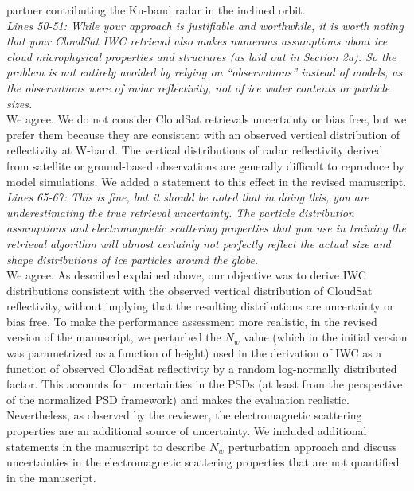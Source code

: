 \documentclass[12pt]{article}
\begin{document}
partner contributing the Ku-band radar in the inclined orbit.\\
\newline
\textit{Lines 50-51: While your approach is justifiable and worthwhile, it is worth noting that your CloudSat IWC retrieval 
also makes numerous assumptions about ice cloud microphysical properties and structures (as laid out in Section 2a). 
So the problem is not entirely avoided by relying on “observations” instead of models, as the observations were of 
radar reflectivity, not of ice water contents or particle sizes.}\\
\newline
We agree. We do not consider CloudSat retrievals uncertainty or bias free, but we prefer them because
they are consistent with an observed vertical distribution of reflectivity at W-band. The vertical distributions of radar reflectivity
derived from satellite or ground-based observations are generally difficult to reproduce by model simulations. We added a statement 
to this effect in the revised manuscript.\\
\newline
\textit{Lines 65-67: This is fine, but it should be noted that in doing this, you are underestimating the true retrieval 
uncertainty. The particle distribution assumptions and electromagnetic scattering properties that you use in training 
the retrieval algorithm will almost certainly not perfectly reflect the actual size and shape distributions of ice 
particles around the globe.}\\
\newline
We agree. As described explained above, our  objective was to derive IWC distributions consistent with the observed vertical distribution of
CloudSat reflectivity, without implying that the resulting distributions are uncertainty or bias free.  To make the performance
assessment more realistic, in the revised version of the manuscript, we perturbed the $N_w$ value (which in the initial version was
parametrized as a function of height) used in the derivation of IWC as a function of observed CloudSat reflectivity by a random log-normally
distributed factor. This accounts for uncertainties in the PSDs (at least from the perspective of the normalized PSD framework) and 
makes the evaluation realistic. Nevertheless, as observed by the reviewer, the electromagnetic scattering properties are 
an additional source of uncertainty.  We included additional statements in the manuscript to describe $N_w$ perturbation approach and
discuss uncertainties in the electromagnetic scattering properties that are not quantified in the manuscript.\\ 
\end{document}
